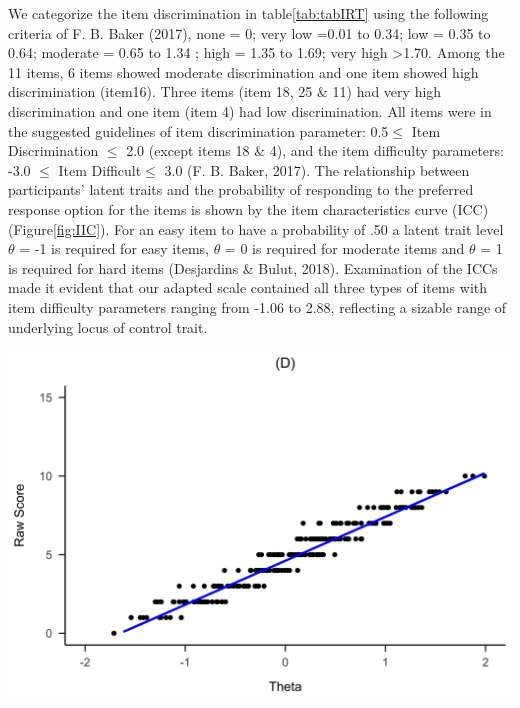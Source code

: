 \documentclass[
  man]{apa6}
\begin{document}
We categorize the item discrimination in table\ref{tab:tabIRT} using the following criteria of F. B. Baker (2017), none = 0; very low =0.01 to 0.34; low = 0.35 to 0.64; moderate = 0.65 to 1.34 ; high = 1.35 to 1.69; very high \textgreater1.70. Among the 11 items, 6 items showed moderate discrimination and one item showed high discrimination (item16). Three items (item 18, 25 \& 11) had very high discrimination and one item (item 4) had low discrimination. All items were in the suggested guidelines of item discrimination parameter: 0.5\(\le\) Item Discrimination \(\le\) 2.0 (except items 18 \& 4), and the item difficulty parameters: -3.0 \(\le\) Item Difficult\(\le\) 3.0 (F. B. Baker, 2017). The relationship between participants' latent traits and the probability of responding to the preferred response option for the items is shown by the item characteristics curve (ICC) (Figure\ref{fig:IIC}). For an easy item to have a probability of .50 a latent trait level \(\theta\) = -1 is required for easy items, \(\theta\) = 0 is required for moderate items and \(\theta\) = 1 is required for hard items (Desjardins \& Bulut, 2018). Examination of the ICCs made it evident that our adapted scale contained all three types of items with item difficulty parameters ranging from -1.06 to 2.88, reflecting a sizable range of underlying locus of control trait.

\includegraphics{Rotterpaper_files/figure-latex/irt-plots-1.png}
\end{document}

